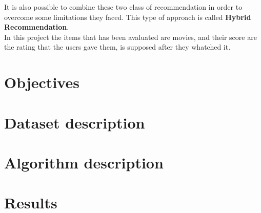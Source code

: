 \documentclass{article}
\begin{document}
It is also possible to combine these two class of recommendation in order to overcome some limitations they faced. This type of approach is called \textbf{Hybrid Recommendation}.\\
In this project the items that has been avaluated are movies, and their score are the rating that the users gave them, is supposed after they whatched it.

\section{Objectives}

\section{Dataset description}

\section{Algorithm description}

\section{Results}
\end{document}
